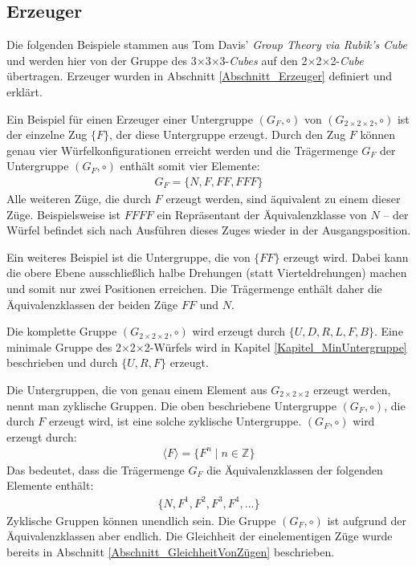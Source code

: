 \documentclass[12pt,a4paper, usenames, dvipsnames]{article}
\theoremstyle{mystyle}
\theoremstyle{definition}
\newcommand{\Gtwo}{\ensuremath{G_{2\times 2\times 2}}}
\newcommand{\Ttwo}{2$\times$2$\times$2-}
\newcommand{\Tthree}{3$\times$3$\times$3-}
\begin{document}
%
%
%
%
%
%
%
%
%
%
%
%
%
%
%
%
%
%
%
%

\subsection{Erzeuger}
\label{Abschnitt_ErzeugerGF}

Die folgenden Beispiele stammen aus Tom Davis' \textit{Group Theory via Rubik's Cube} \cite{TD} und werden hier von der Gruppe des \Tthree \textit{Cubes} auf den \Ttwo \textit{Cube} übertragen. Erzeuger wurden in Abschnitt \ref{Abschnitt_Erzeuger} definiert und erklärt.


Ein Beispiel für einen Erzeuger einer Untergruppe $(G_F, \circ)$ von $(\Gtwo, \circ)$ ist der einzelne Zug $\{ F \}$, der diese Untergruppe erzeugt. Durch den Zug $F$ können genau vier Würfelkonfigurationen erreicht werden und die Trägermenge $G_F$ der Untergruppe $(G_F, \circ)$ enthält somit vier Elemente:
\begin{align*}
G_F = \{N, F, FF, FFF\}
\end{align*}
Alle weiteren Züge, die durch $F$ erzeugt werden, sind äquivalent zu einem dieser Züge. Beispielsweise ist $FFFF$ ein Repräsentant der Äquivalenzklasse von $N$ -- der Würfel befindet sich nach Ausführen dieses Zuges wieder in der Ausgangsposition.


Ein weiteres Beispiel ist die Untergruppe, die von $\{FF\}$ erzeugt wird. Dabei kann die obere Ebene ausschließlich halbe Drehungen (statt Vierteldrehungen) machen und somit nur zwei Positionen erreichen. Die Trägermenge enthält daher die Äquivalenzklassen der beiden Züge $FF$ und $N$.


Die komplette Gruppe $(\Gtwo, \circ)$ wird erzeugt durch $\{U, D, R, L, F, B\}$. Eine minimale Gruppe des \Ttwo Würfels wird in Kapitel \ref{Kapitel_MinUntergruppe} beschrieben und durch $\{U, R, F\}$ erzeugt.

Die Untergruppen, die von genau einem Element aus $\Gtwo$ erzeugt werden, nennt man zyklische Gruppen. Die oben beschriebene Untergruppe $(G_F, \circ)$, die durch $ F $ erzeugt wird, ist eine solche zyklische Untergruppe.
$(G_F, \circ)$ wird erzeugt durch:
\begin{align*}
\langle F \rangle = \{ F^n \mid n \in \mathbb{Z}\}
\end{align*}
Das bedeutet, dass die Trägermenge $G_F$ die Äquivalenzklassen der folgenden Elemente enthält: 
\begin{align*}
\{N, F^1, F^2, F^3, F^4, ...\}
\end{align*}
Zyklische Gruppen können unendlich sein. Die Gruppe $(G_F,  \circ)$ ist aufgrund der Äquivalenz\-klassen aber endlich. Die Gleichheit der einelementigen Züge wurde bereits in Abschnitt \ref{Abschnitt_GleichheitVonZügen} beschrieben.
\end{document}
